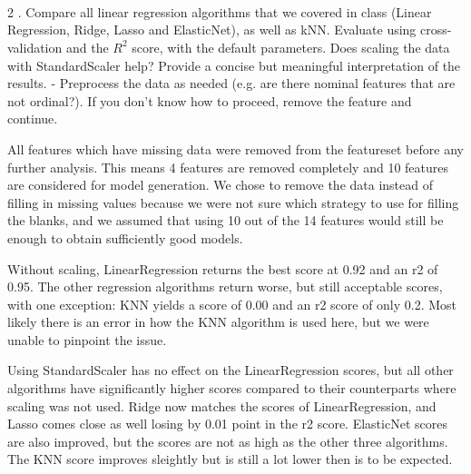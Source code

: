 \documentclass[11pt]{article}
\begin{document}
    \begin{center}
    \end{center}
    { \hspace*{\fill} \\}
    
    \begin{center}
    \end{center}
    { \hspace*{\fill} \\}
    
    \begin{center}
    \end{center}
    { \hspace*{\fill} \\}
    
    2 . Compare all linear regression algorithms that we covered in class
(Linear Regression, Ridge, Lasso and ElasticNet), as well as kNN.
Evaluate using cross-validation and the \(R^2\) score, with the default
parameters. Does scaling the data with StandardScaler help? Provide a
concise but meaningful interpretation of the results. - Preprocess the
data as needed (e.g. are there nominal features that are not ordinal?).
If you don't know how to proceed, remove the feature and continue.

All features which have missing data were removed from the featureset
before any further analysis. This means 4 features are removed
completely and 10 features are considered for model generation. We chose
to remove the data instead of filling in missing values because we were
not sure which strategy to use for filling the blanks, and we assumed
that using 10 out of the 14 features would still be enough to obtain
sufficiently good models.

Without scaling, LinearRegression returns the best score at 0.92 and an
r2 of 0.95. The other regression algorithms return worse, but still
acceptable scores, with one exception: KNN yields a score of 0.00 and an
r2 score of only 0.2. Most likely there is an error in how the KNN
algorithm is used here, but we were unable to pinpoint the issue.

Using StandardScaler has no effect on the LinearRegression scores, but
all other algorithms have significantly higher scores compared to their
counterparts where scaling was not used. Ridge now matches the scores of
LinearRegression, and Lasso comes close as well losing by 0.01 point in
the r2 score. ElasticNet scores are also improved, but the scores are
not as high as the other three algorithms. The KNN score improves
sleightly but is still a lot lower then is to be expected.
\end{document}
